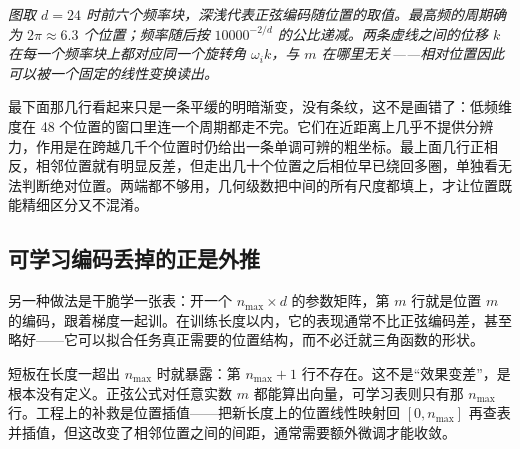 \begin{center}
\end{center}

\emph{图取 \(d=24\) 时前六个频率块，深浅代表正弦编码随位置的取值。最高频的周期确为 \(2\pi\approx6.3\) 个位置；频率随后按 \(10000^{-2/d}\) 的公比递减。两条虚线之间的位移 \(k\) 在每一个频率块上都对应同一个旋转角 \(\omega_i k\)，与 \(m\) 在哪里无关——相对位置因此可以被一个固定的线性变换读出。}

最下面那几行看起来只是一条平缓的明暗渐变，没有条纹，这不是画错了：低频维度在 48 个位置的窗口里连一个周期都走不完。它们在近距离上几乎不提供分辨力，作用是在跨越几千个位置时仍给出一条单调可辨的粗坐标。最上面几行正相反，相邻位置就有明显反差，但走出几十个位置之后相位早已绕回多圈，单独看无法判断绝对位置。两端都不够用，几何级数把中间的所有尺度都填上，才让位置既能精细区分又不混淆。

\subsection{可学习编码丢掉的正是外推}

另一种做法是干脆学一张表：开一个 \(n_{\max}\times d\) 的参数矩阵，第 \(m\) 行就是位置 \(m\) 的编码，跟着梯度一起训。在训练长度以内，它的表现通常不比正弦编码差，甚至略好——它可以拟合任务真正需要的位置结构，而不必迁就三角函数的形状。

短板在长度一超出 \(n_{\max}\) 时就暴露：第 \(n_{\max}+1\) 行不存在。这不是``效果变差''，是根本没有定义。正弦公式对任意实数 \(m\) 都能算出向量，可学习表则只有那 \(n_{\max}\) 行。工程上的补救是位置插值——把新长度上的位置线性映射回 \([0,n_{\max}]\) 再查表并插值，但这改变了相邻位置之间的间距，通常需要额外微调才能收敛。

